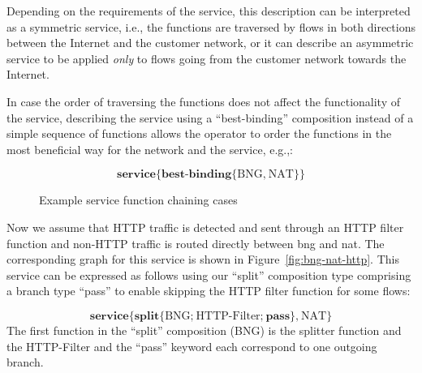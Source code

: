 \documentclass{sig-alternate-per}
\begin{document}
Depending on the requirements of the service, this description can be interpreted
as a symmetric service, i.e., the functions are traversed by flows in both directions
between the Internet and the customer network, or it can describe an asymmetric 
service to be applied \emph{only} to flows going from the customer network towards the 
Internet. 

In case the order of traversing the functions does not affect the functionality
of the service, describing the service using a ``best-binding'' composition instead
of a simple sequence of functions allows the operator to order the functions in 
the most beneficial way for the network and the service, e.g.,:

{\scriptsize
\vspace{-8pt}
\begin{equation*}
\textbf{service} \textbf{\{} \textbf{best-binding} \textbf{\{} \text{BNG} \textbf{,} ~\text{NAT} \textbf{\}} \textbf{\}} 
\end{equation*}
}

\begin{figure}[!t]
\centering
{}
\vspace{-2pt}
\vspace{0pt}
\vspace{-2pt}

\caption{Example service function chaining cases}
\end{figure}

Now we assume that HTTP traffic is detected and sent through an HTTP filter function and 
non-HTTP traffic is routed directly between \ac{bng} and \ac{nat}. The corresponding
graph for this service is shown in Figure~\ref{fig:bng-nat-http}. This service 
can be expressed as follows using our ``split'' composition type comprising a branch type
``pass'' to enable skipping the HTTP filter function for some flows:

{\scriptsize
\vspace{-8pt}
\begin{equation*}
\textbf{service} \textbf{\{} \textbf{split} \textbf{\{} \text{BNG} \textbf{;} ~\text{HTTP-Filter} \textbf{;} ~\textbf{pass} \textbf{\}} \textbf{,} ~\text{NAT} \textbf{\}} 
\end{equation*}
}
The first function in the ``split'' composition (BNG) is the splitter
function and the HTTP-Filter and the ``pass'' keyword each correspond to one outgoing branch.
\end{document}
